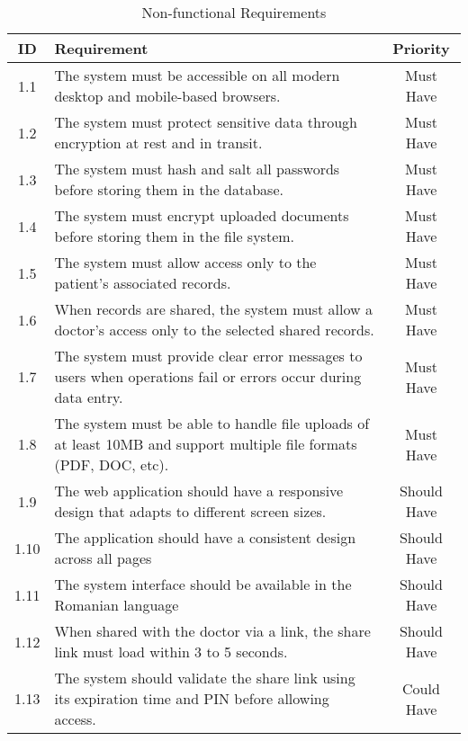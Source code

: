 \begin{table}[htbp]
    \centering
    \begin{tabular}{|c|p{10cm}|c|}
    \hline
    \textbf{ID}  & \textbf{Requirement}  & \textbf{Priority} \\ \hline
    1.1  & The system must be accessible on all modern desktop and mobile-based browsers. & Must Have \\ \hline
    1.2  & The system must protect sensitive data through encryption at rest and in transit. & Must Have \\ \hline
    1.3 & The system must hash and salt all passwords before storing them in the database. & Must Have \\ \hline
    1.4 & The system must encrypt uploaded documents before storing them in the file system. & Must Have \\ \hline
    1.5 & The system must allow access only to the patient's associated records. & Must Have \\ \hline
    1.6 & When records are shared, the system must allow a doctor's access only to the selected shared records. & Must Have \\ \hline  
    1.7 & The system must provide clear error messages to users when operations fail or errors occur during data entry. & Must Have \\ \hline
    1.8 & The system must be able to handle file uploads of at least 10MB and support multiple file formats (PDF, DOC, etc). & Must Have \\ \hline
    1.9 & The web application should have a responsive design that adapts to different screen sizes. & Should Have \\ \hline
    1.10 & The application should have a consistent design across all pages & Should Have \\ \hline
    1.11 & The system interface should be available in the Romanian language & Should Have \\ \hline
    1.12  & When shared with the doctor via a link, the share link must load within 3 to 5 seconds. & Should Have \\ \hline
    1.13 & The system should validate the share link using its expiration time and PIN before allowing access. & Could Have \\ \hline
    \end{tabular}
    \caption{Non-functional Requirements}
\end{table}


